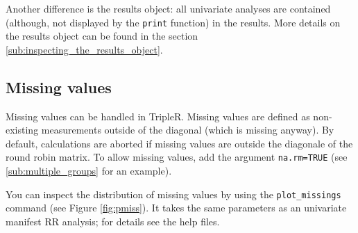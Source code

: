 \documentclass[a4paper]{article}\usepackage[]{graphicx}\usepackage[]{color}
\begin{document}
Another difference is the results object: all univariate analyses are contained (although, not displayed by the \texttt{print} function) in the results. More details on the results object can be found in the section \ref{sub:inspecting_the_results_object}.



\subsection{Missing values} %
\label{sub:missing_values}
Missing values can be handled in TripleR. Missing values are defined as non-existing measurements outside of the diagonal (which is missing anyway). By default, calculations are aborted if missing values are outside the diagonale of the round robin matrix. To allow missing values, add the argument \texttt{na.rm=TRUE} (see \ref{sub:multiple_groups} for an example).

You can inspect the distribution of missing values by using the \texttt{plot\_missings} command (see Figure \ref{fig:pmiss}). It takes the same parameters as an univariate manifest RR analysis; for details see the help files.
\end{document}
